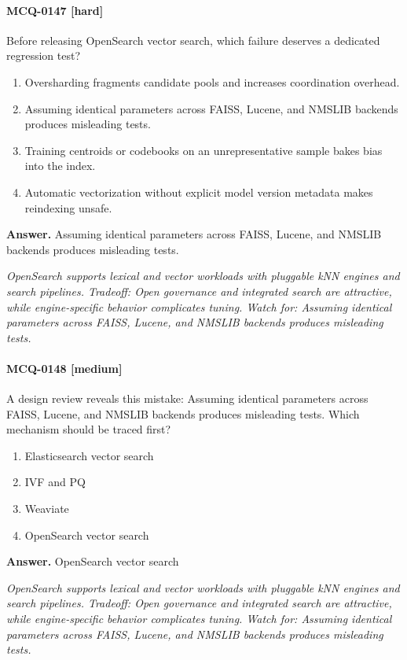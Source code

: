 \paragraph{MCQ-0147 [hard]} Before releasing OpenSearch vector search, which failure deserves a dedicated regression test?
\begin{enumerate}[label=\Alph*.]
\item Oversharding fragments candidate pools and increases coordination overhead.
\item Assuming identical parameters across FAISS, Lucene, and NMSLIB backends produces misleading tests.
\item Training centroids or codebooks on an unrepresentative sample bakes bias into the index.
\item Automatic vectorization without explicit model version metadata makes reindexing unsafe.
\end{enumerate}
\noindent\textbf{Answer.} Assuming identical parameters across FAISS, Lucene, and NMSLIB backends produces misleading tests.
\par\textit{OpenSearch supports lexical and vector workloads with pluggable kNN engines and search pipelines. Tradeoff: Open governance and integrated search are attractive, while engine-specific behavior complicates tuning. Watch for: Assuming identical parameters across FAISS, Lucene, and NMSLIB backends produces misleading tests.}
\paragraph{MCQ-0148 [medium]} A design review reveals this mistake: Assuming identical parameters across FAISS, Lucene, and NMSLIB backends produces misleading tests. Which mechanism should be traced first?
\begin{enumerate}[label=\Alph*.]
\item Elasticsearch vector search
\item IVF and PQ
\item Weaviate
\item OpenSearch vector search
\end{enumerate}
\noindent\textbf{Answer.} OpenSearch vector search
\par\textit{OpenSearch supports lexical and vector workloads with pluggable kNN engines and search pipelines. Tradeoff: Open governance and integrated search are attractive, while engine-specific behavior complicates tuning. Watch for: Assuming identical parameters across FAISS, Lucene, and NMSLIB backends produces misleading tests.}
